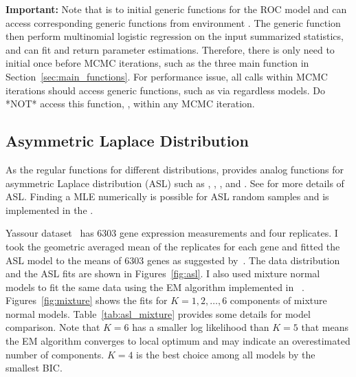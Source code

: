 {\color{red} \bf Important:}
Note that  is to initial generic functions
for the ROC model and  can access corresponding generic
functions from environment . The generic function then
perform multinomial logistic regression on the input summarized statistics,
and  can fit and return parameter estimations.
Therefore, there is only need to initial once before MCMC iterations, such as
the three main function in Section~\ref{sec:main_functions}. For performance
issue, all calls within MCMC iterations should access generic functions, such
as via  regardless models. Do *NOT*
access this function, , within any MCMC iteration.




\subsection[Asymmetric Laplace Distribution]{Asymmetric Laplace Distribution}
\label{sec:asl}

As the regular  functions for different distributions,
 provides analog functions for asymmetric Laplace distribution
(ASL) such as , , , and .
See \citep{KKP2001} for more details of ASL.
Finding a MLE numerically is possible for ASL random samples and
is implemented in the .

Yassour dataset~\citep{Yassour2009} has 6303 gene expression measurements and
four replicates.
I took the geometric averaged mean of the replicates for each gene and
fitted the ASL model to the means of 6303 genes as suggested
by~\cite{Wallace2013}.
The data distribution and the ASL fits are shown
in Figures~\ref{fig:asl}.
I also used mixture normal models to fit the same data using the EM
algorithm implemented in ~\citep{EMCluster}.
Figures~\ref{fig:mixture} shows the fits
for $K = 1, 2,\ldots, 6$ components of mixture normal models.
Table~\ref{tab:asl_mixture}
provides some details for model comparison. Note that $K=6$ has
a smaller log likelihood than $K=5$ that means the EM algorithm
converges to local optimum and may indicate an overestimated number of
components. $K = 4$ is the best choice among all models by the smallest
BIC.

